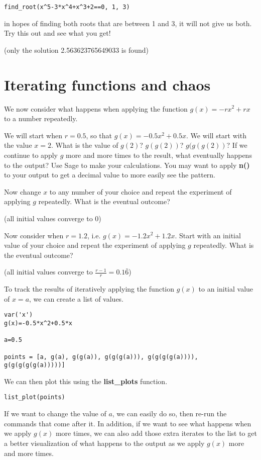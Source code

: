 \documentclass[12pt]{amsart}
\theoremstyle{definition}
\theoremstyle{definition}
\begin{document}
\begin{verbatim}
find_root(x^5-3*x^4+x^3+2==0, 1, 3)
\end{verbatim}

in hopes of finding both roots that are between 1 and 3, it will not
give us both. Try this out and see what you get!

(only the solution 2.563623765649033 is found)

\section{Iterating functions and chaos}

We now consider what happens when applying the function $g(x)=-rx^2+rx$
to a number repeatedly.

We will start when $r=0.5$, so that $g(x)=-0.5x^2+0.5x$. We will start with
the value $x=2$. What is the value of $g(2)$? $g(g(2))$? $g(g(g(2))$?
If we continue to apply $g$ more and more times to the result, what eventually
happens to the output? Use Sage to make your calculations. You may want to
apply \textbf{n()} to your output to get a decimal value to more easily
see the pattern.

Now change $x$ to any number of your choice and repeat the experiment of
applying $g$ repeatedly. What is the eventual outcome?

(all initial values converge to $0$)

Now consider when $r=1.2$, i.e. $g(x)=-1.2x^2+1.2x$.
Start with an initial value of your choice and repeat
the experiment of applying $g$ repeatedly. What is the eventual outcome?

(all initial values converge to $\frac{r-1}{r}=0.1\bar{6}$)

To track the results of iteratively applying the function $g(x)$ to an initial
value of $x=a$, we can create a list of values.

\begin{verbatim}
var('x')
g(x)=-0.5*x^2+0.5*x

a=0.5

points = [a, g(a), g(g(a)), g(g(g(a))), g(g(g(g(a)))), g(g(g(g(g(a)))))]
\end{verbatim}

We can then plot this using the \textbf{list\_plots} function.

\begin{verbatim}
list_plot(points)
\end{verbatim}

If we want to change the value of $a$, we can easily do so, then re-run
the commands that come after it. In addition, if we want to see what
happens when we apply $g(x)$ more times, we can also add those
extra iterates to the list to get a better visualization of what happens
to the output as we apply $g(x)$ more and more times.
\end{document}
